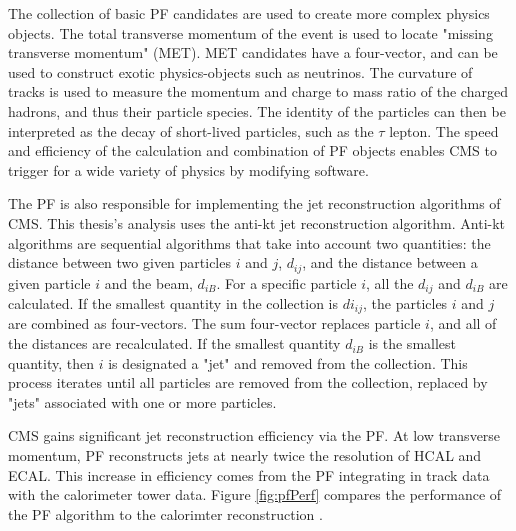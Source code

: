The collection of basic PF candidates are used to create more complex physics objects. The total transverse momentum of the event is used to locate "missing transverse momentum" (MET). MET candidates have a four-vector, and can be used to construct exotic physics-objects such as neutrinos. The curvature of tracks is used to measure the momentum and charge to mass ratio of the charged hadrons, and thus their particle species. The identity of the particles can then be interpreted as the decay of short-lived particles, such as the $\tau$ lepton. The speed and efficiency of the calculation and combination of PF objects enables CMS to trigger for a wide variety of physics by modifying software.

The PF is also responsible for implementing the jet reconstruction algorithms of CMS. This thesis's analysis uses the anti-kt jet reconstruction algorithm. Anti-kt algorithms are sequential algorithms that take into account two quantities: the distance between two given particles $i$ and $j$, $d_{ij}$, and the distance between a given particle $i$ and the beam, $d_{iB}$. For a specific particle $i$, all the $d_{ij}$ and $d_{iB}$ are calculated. If the smallest quantity in the collection is $di_{ij}$, the particles $i$ and $j$ are combined as four-vectors. The sum four-vector replaces particle $i$, and all of the distances are recalculated. If the smallest quantity $d_{iB}$ is the smallest quantity, then $i$ is designated a "jet" and removed from the collection. This process iterates until all particles are removed from the collection, replaced by "jets" associated with one or more particles.

CMS gains significant jet reconstruction efficiency via the PF. At low transverse momentum, PF reconstructs jets at nearly twice the resolution of HCAL and ECAL. This increase in efficiency comes from the PF integrating in track data with the calorimeter tower data. Figure \ref{fig:pfPerf} compares the performance of the PF algorithm to the calorimter reconstruction \cite{Sirunyan:2017ulk}.


